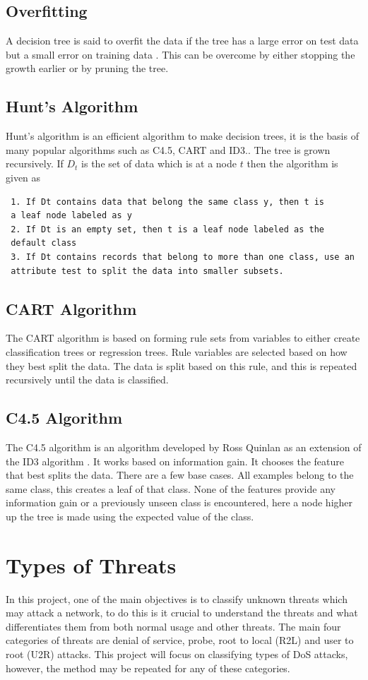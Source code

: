 \subsection{Overfitting}
A decision tree is said to overfit the data if the tree has a large error on test data but a small error on training data \cite{10.5555/2380985}. This can be overcome by either stopping the growth earlier or by pruning the tree.

\subsection{Hunt’s Algorithm}
Hunt’s algorithm is an efficient algorithm to make decision trees, it is the basis of many popular algorithms such as C4.5, CART and ID3.\cite{I2DM}. The tree is grown recursively. If $D_t$ is the set of data which is at a node $t$ then the algorithm is given as
\begin{verbatim}
 1. If Dt contains data that belong the same class y, then t is 
 a leaf node labeled as y
 2. If Dt is an empty set, then t is a leaf node labeled as the
 default class
 3. If Dt contains records that belong to more than one class, use an 
 attribute test to split the data into smaller subsets. 
\end{verbatim}

\subsection{CART Algorithm}
The CART algorithm is based on forming rule sets from variables to either create classification trees or regression trees. \cite{cart} Rule variables are selected based on how they best split the data. The data is split based on this rule, and this is repeated recursively until the data is classified.

\subsection{C4.5 Algorithm}
The C4.5 algorithm is an algorithm developed by Ross Quinlan as an extension of the ID3 algorithm \cite{c4.5}. It works based on information gain. It chooses the feature that best splits the data. There are a few base cases. All examples belong to the same class, this creates a leaf of that class. None of the features provide any information gain or a previously unseen class is encountered, here a node higher up the tree is made using the expected value of the class.

\section{Types of Threats}
In this project, one of the main objectives is to classify unknown threats which may attack a network, to do this is it crucial to understand the threats and what differentiates them from both normal usage and other threats. The main four categories of threats are denial of service, probe, root to local (R2L) and user to root (U2R) attacks. This project will focus on classifying types of DoS attacks, however, the method may be repeated for any of these categories. 


